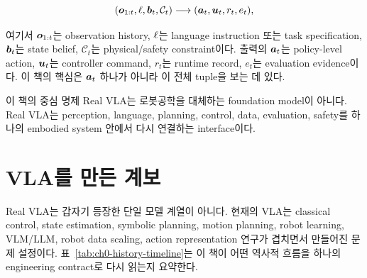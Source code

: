 \begin{equation}
  (\bm{o}_{1:t}, \ell, \bm{b}_t, \mathcal{C}_t)
  \longrightarrow
  (\bm{a}_t, \bm{u}_t, r_t, e_t),
  \label{eq:ch0-real-vla-map}
\end{equation}

여기서 $\bm{o}_{1:t}$는 observation history, $\ell$는 language instruction 또는 task specification, $\bm{b}_t$는 state belief, $\mathcal{C}_t$는 physical/safety constraint이다. 출력의 $\bm{a}_t$는 policy-level action, $\bm{u}_t$는 controller command, $r_t$는 runtime record, $e_t$는 evaluation evidence이다. 이 책의 핵심은 $\bm{a}_t$ 하나가 아니라 이 전체 tuple을 보는 데 있다.

\begin{definitionbox}{이 책의 중심 명제}
Real VLA는 로봇공학을 대체하는 foundation model이 아니다. Real VLA는 perception, language, planning, control, data, evaluation, safety를 하나의 embodied system 안에서 다시 연결하는 interface이다.
\end{definitionbox}

\section{VLA를 만든 계보}

Real VLA는 갑자기 등장한 단일 모델 계열이 아니다. 현재의 VLA는 classical control, state estimation, symbolic planning, motion planning, robot learning, VLM/LLM, robot data scaling, action representation 연구가 겹치면서 만들어진 문제 설정이다. 표~\ref{tab:ch0-history-timeline}는 이 책이 어떤 역사적 흐름을 하나의 engineering contract로 다시 읽는지 요약한다.

